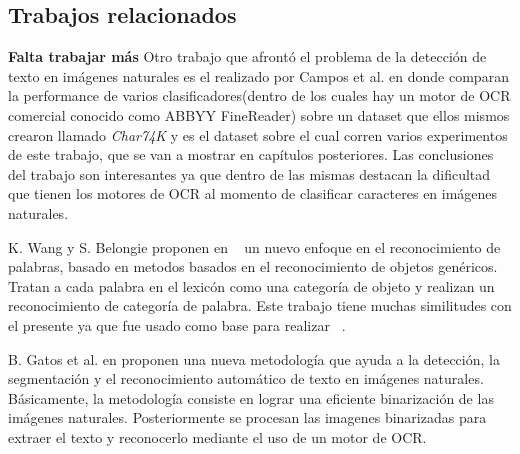 \subsection{Trabajos relacionados}
	\textbf{Falta trabajar más}
	Otro trabajo que afrontó el problema de la detección de texto en imágenes naturales es el realizado por Campos et al. en \cite{dCBV09} donde comparan la performance de varios clasificadores(dentro de los cuales hay un motor de OCR comercial conocido como ABBYY FineReader) sobre un dataset que ellos mismos crearon llamado \textit{Char74K} y es el dataset sobre el cual corren varios experimentos de este trabajo, que se van a mostrar en capítulos posteriores. Las conclusiones del trabajo son interesantes ya que dentro de las mismas destacan la dificultad que tienen los motores de OCR al momento de clasificar caracteres en imágenes naturales.
	
	K. Wang y S. Belongie proponen en ~\cite{WangBelongie} un nuevo enfoque en el reconocimiento de palabras, basado en metodos basados en el reconocimiento de objetos genéricos. Tratan a cada palabra en el lexicón como una categoría de objeto y realizan un reconocimiento de categoría de palabra. Este trabajo tiene muchas similitudes con el presente ya que fue usado como base para realizar ~\cite{wang}.
	
	B. Gatos et al. en \cite{GPP03} proponen una nueva metodología que ayuda a la detección, la segmentación y el reconocimiento automático de texto en imágenes naturales. Básicamente, la metodología consiste en lograr una eficiente binarización de las imágenes naturales. Posteriormente se procesan las imagenes binarizadas para extraer el texto y reconocerlo mediante el uso de un motor de OCR.
